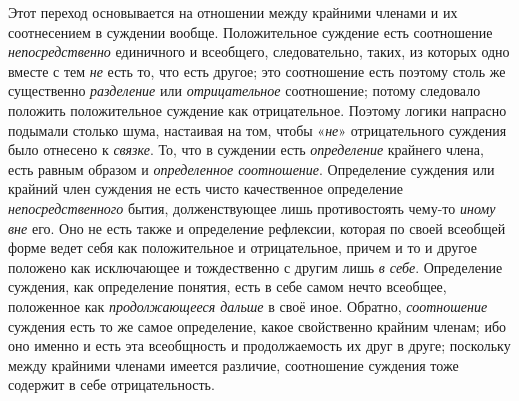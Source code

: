 \documentclass[twoside]{article}
\begin{document}
{{{Этот переход основывается на отношении между крайними членами
и их соотнесением в суждении вообще. Положительное суждение есть
соотношение {\em непосредственно}
единичного и всеобщего, следовательно, таких,
из которых одно вместе с тем {\em не}
есть то, что есть другое; это соотношение есть поэтому столь
же существенно {\em разделение}
или {\em отрицательное}
соотношение; потому следовало положить положительное суждение
как отрицательное. Поэтому логики напрасно подымали столько шума, настаивая
на том, чтобы «{\em не}»
отрицательного суждения было отнесено к
{\em связке}. То, что в
суждении есть {\em определение}
крайнего члена, есть равным образом и
{\em определенное соотношение}.
Определение суждения или крайний член суждения не есть чисто
качественное определение
{\em непосредственного}
бытия, долженствующее лишь противостоять чему-то
{\em иному вне} его.
Оно не есть также и определение рефлексии, которая по своей всеобщей форме
ведет себя как положительное и отрицательное, причем и то и другое положено
как исключающее и тождественно с другим лишь
{\em в себе}. Определение
суждения, как определение понятия, есть в себе самом нечто всеобщее,
положенное как {\em продолжающееся
дальше} в своё иное. Обратно,
{\em соотношение}
суждения есть то же самое определение, какое свойственно
крайним членам; ибо оно именно и есть эта всеобщность и продолжаемость их
друг в друге; поскольку между крайними членами имеется различие,
соотношение суждения тоже содержит в себе отрицательность.

}}}
\end{document}
